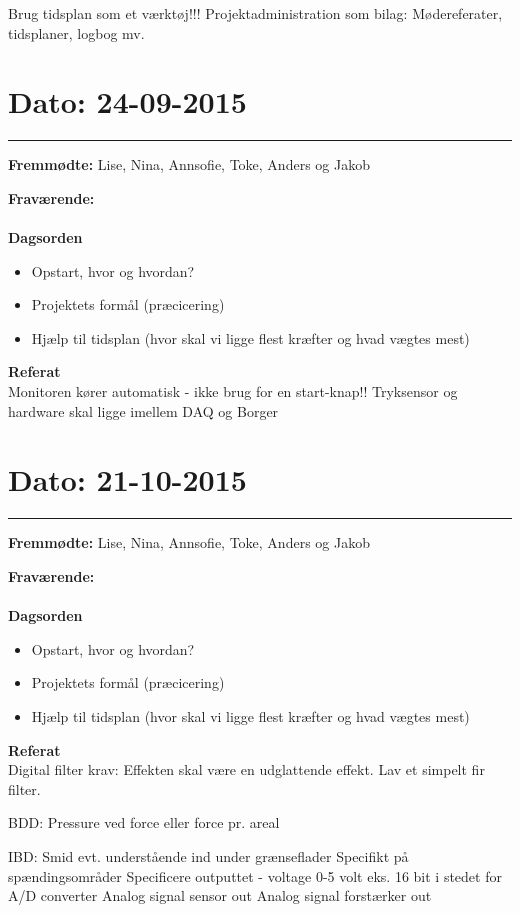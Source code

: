 Brug tidsplan som et værktøj!!! 
Projektadministration som bilag: Mødereferater, tidsplaner, logbog mv. 



\section{Dato: 24-09-2015}
\hrule

\textbf{Fremmødte:} Lise, Nina, Annsofie, Toke, Anders og Jakob

\textbf{Fraværende:} 
\\
\\
\textbf{Dagsorden}
\begin{itemize}
	\item Opstart, hvor og hvordan?
	\item Projektets formål (præcicering)
	\item Hjælp til tidsplan (hvor skal vi ligge flest kræfter og hvad vægtes mest)
\end{itemize}

\textbf{Referat}
\\
Monitoren kører automatisk - ikke brug for en start-knap!!
Tryksensor og hardware skal ligge imellem DAQ og Borger



\section{Dato: 21-10-2015}
\hrule

\textbf{Fremmødte:} Lise, Nina, Annsofie, Toke, Anders og Jakob

\textbf{Fraværende:} 
\\
\\
\textbf{Dagsorden}
\begin{itemize}
	\item Opstart, hvor og hvordan?
	\item Projektets formål (præcicering)
	\item Hjælp til tidsplan (hvor skal vi ligge flest kræfter og hvad vægtes mest)
\end{itemize}

\textbf{Referat}
\\
Digital filter krav: 
Effekten skal være en udglattende effekt.
Lav et simpelt fir filter.

BDD:
Pressure ved force eller force pr. areal

IBD: 
Smid evt. understående ind under grænseflader
Specifikt på spændingsområder
Specificere outputtet - voltage 0-5 volt eks.
16 bit i stedet for A/D converter
Analog signal sensor out
Analog signal forstærker out

